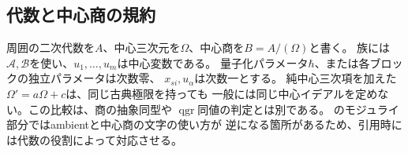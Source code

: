 \subsection{代数と中心商の規約}
周囲の二次代数を$A$、中心三次元を$\Omega$、中心商を$B=A/(\Omega)$と書く。
族には$\mathcal A,\mathcal B$を使い、$u_1,\ldots,u_m$は中心変数である。
量子化パラメータ$\hbar$、または各ブロックの独立パラメータは次数零、
$x_{si},u_\alpha$は次数一とする。
純中心三次項を加えた$\Omega'=a\Omega+c$は、同じ古典極限を持っても
一般には同じ中心イデアルを定めない。この比較は、商の抽象同型や
$\operatorname{qgr}$同値の判定とは別である。
\cite{NCCubicMain}のモジュライ部分ではambientと中心商の文字の使い方が
逆になる箇所があるため、引用時には代数の役割によって対応させる。
\par
